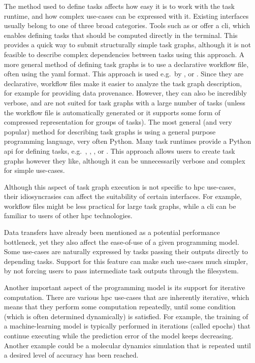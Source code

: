 \begin{description}[wide=0pt]
	\item[Task definition interfaces] The method used to define tasks affects how easy it is to work with the task runtime, and how
		complex use-cases can be expressed with it. Existing interfaces usually belong to one of three
		broad categories. Tools such as \gnuparallel{} or \hypershell{} offer a
		\gls{cli}, which enables defining tasks that should be computed directly in the
		terminal. This provides a quick way to submit structurally simple task graphs, although it is not
		feasible to describe complex dependencies between tasks using this approach. A more general method
		of defining task graphs is to use a declarative workflow file, often using the
		\gls{yaml} format. This approach is used e.g.\ by \pegasus{},
		\autosubmit{} or \merlin{}. Since they are declarative, workflow files make
		it easier to analyze the task graph description, for example for providing data provenance.
		However, they can also be incredibly verbose, and are not suited for task graphs with a large
		number of tasks (unless the workflow file is automatically generated or it supports some form of
		compressed representation for groups of tasks). The most general (and very popular) method for
		describing task graphs is using a general purpose programming language, very often Python. Many
		task runtimes provide a Python \gls{api} for defining tasks, e.g.\
		\dask{}, \ray{}, \parsl{}, \balsam{} or
		\pegasus{}. This approach allows users to create task graphs however they like,
		although it can be unnecessarily verbose and complex for simple use-cases.

		Although this aspect of task graph execution is not specific to \gls{hpc} use-cases,
		their idiosyncrasies can affect the suitability of certain interfaces. For example, workflow files
		might be less practical for large task graphs, while a \gls{cli} can be familiar to
		users of other \gls{hpc} technologies.

	\item[Data transfers] Data transfers have already been mentioned as a potential performance bottleneck, yet they also
		affect the ease-of-use of a given programming model. Some use-cases are naturally expressed by
		tasks passing their outputs directly to depending tasks. Support for this feature can make such
		use-cases much simpler, by not forcing users to pass intermediate task outputs through the
		filesystem.

	\item[Iterative computation] Another important aspect of the programming model is its support for iterative computation. There
		are various \gls{hpc} use-cases that are inherently iterative, which means that they
		perform some computation repeatedly, until some condition (which is often determined dynamically)
		is satisfied. For example, the training of a machine-learning model is typically performed in
		iterations (called epochs) that continue executing while the prediction error of the model keeps
		decreasing. Another example could be a molecular dynamics simulation that is repeated until a
		desired level of accuracy has been reached.


\end{description}
